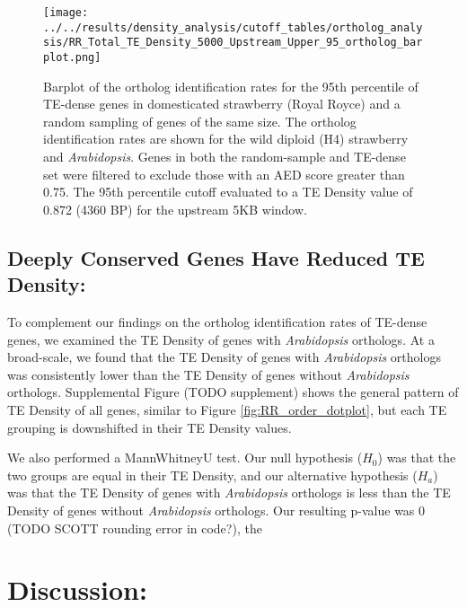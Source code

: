 \documentclass[fleqn,10pt]{olplainarticle}
\begin{document}
\begin{figure}[ht]
\centering
\texttt{[image: ../../results/density\_analysis/cutoff\_tables/ortholog\_analysis/RR\_Total\_TE\_Density\_5000\_Upstream\_Upper\_95\_ortholog\_barplot.png]}
	\caption{Barplot of the ortholog identification rates for the 95th percentile of TE-dense genes in domesticated strawberry (Royal Royce) and a random sampling of genes of the same size. The ortholog identification rates are shown for the wild diploid (H4) strawberry and \textit{Arabidopsis}. Genes in both the random-sample and TE-dense set were filtered to exclude those with an AED score greater than 0.75. The 95th percentile cutoff evaluated to a TE Density value of 0.872 (4360 BP) for the upstream 5KB window.}
\label{fig:ortholog_survival_rate_barplot}
\end{figure}

\subsection{Deeply Conserved Genes Have Reduced TE Density:}
To complement our findings on the ortholog identification rates of TE-dense genes, we examined the TE Density of genes with \textit{Arabidopsis} orthologs.
At a broad-scale, we found that the TE Density of genes with \textit{Arabidopsis} orthologs was consistently lower than the TE Density of genes without \textit{Arabidopsis} orthologs.
Supplemental Figure (TODO supplement) shows the general pattern of TE Density of all genes, similar to Figure \ref{fig:RR_order_dotplot}, but each TE grouping is downshifted in their TE Density values.

We also performed a MannWhitneyU test.
Our null hypothesis ($H_{0}$) was that the two groups are equal in their TE Density, and our alternative hypothesis ($H_{a}$) was that the TE Density of genes with \textit{Arabidopsis} orthologs is less than the TE Density of genes without \textit{Arabidopsis} orthologs.
Our resulting p-value was 0 (TODO SCOTT rounding error in code?), the 







\section{Discussion:}
\end{document}
